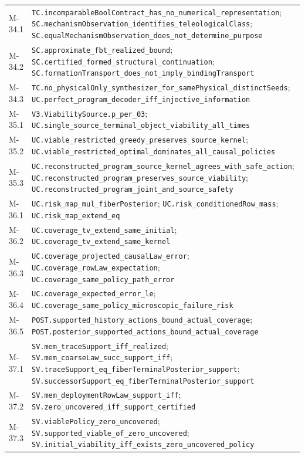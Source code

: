 \documentclass[
  english,
  11pt,
  oneside]{book}
\begin{document}
{\begin{longtable}[]{@{}
  >{\raggedright\arraybackslash}p{}
  >{\raggedright\arraybackslash}p{}@{}}
M-34.1 & \nolinkurl{TC.incomparableBoolContract_has_no_numerical_representation}; \nolinkurl{SC.mechanismObservation_identifies_teleologicalClass}; \nolinkurl{SC.equalMechanismObservation_does_not_determine_purpose} \\
M-34.2 & \nolinkurl{SC.approximate_fbt_realized_bound}; \nolinkurl{SC.certified_formed_structural_continuation}; \nolinkurl{SC.formationTransport_does_not_imply_bindingTransport} \\
M-34.3 & \nolinkurl{TC.no_physicalOnly_synthesizer_for_samePhysical_distinctSeeds}; \nolinkurl{UC.perfect_program_decoder_iff_injective_information} \\
M-35.1 & \nolinkurl{V3.ViabilitySource.p_per_03}; \nolinkurl{UC.single_source_terminal_object_viability_all_times} \\
M-35.2 & \nolinkurl{UC.viable_restricted_greedy_preserves_source_kernel}; \nolinkurl{UC.viable_restricted_optimal_dominates_all_causal_policies} \\
M-35.3 & \nolinkurl{UC.reconstructed_program_source_kernel_agrees_with_safe_action}; \nolinkurl{UC.reconstructed_program_preserves_source_viability}; \nolinkurl{UC.reconstructed_program_joint_and_source_safety} \\
M-36.1 & \nolinkurl{UC.risk_map_mul_fiberPosterior}; \nolinkurl{UC.risk_conditionedRow_mass}; \nolinkurl{UC.risk_map_extend_eq} \\
M-36.2 & \nolinkurl{UC.coverage_tv_extend_same_initial}; \nolinkurl{UC.coverage_tv_extend_same_kernel} \\
M-36.3 & \nolinkurl{UC.coverage_projected_causalLaw_error}; \nolinkurl{UC.coverage_rowLaw_expectation}; \nolinkurl{UC.coverage_same_policy_path_error} \\
M-36.4 & \nolinkurl{UC.coverage_expected_error_le}; \nolinkurl{UC.coverage_same_policy_microscopic_failure_risk} \\
M-36.5 & \nolinkurl{POST.supported_history_actions_bound_actual_coverage}; \nolinkurl{POST.posterior_supported_actions_bound_actual_coverage} \\
M-37.1 & \nolinkurl{SV.mem_traceSupport_iff_realized}; \nolinkurl{SV.mem_coarseLaw_succ_support_iff}; \nolinkurl{SV.traceSupport_eq_fiberTerminalPosterior_support}; \nolinkurl{SV.successorSupport_eq_fiberTerminalPosterior_support} \\
M-37.2 & \nolinkurl{SV.mem_deploymentRowLaw_support_iff}; \nolinkurl{SV.zero_uncovered_iff_support_certified} \\
M-37.3 & \nolinkurl{SV.viablePolicy_zero_uncovered}; \nolinkurl{SV.supported_viable_of_zero_uncovered}; \nolinkurl{SV.initial_viability_iff_exists_zero_uncovered_policy} \\

\end{longtable}}
\end{document}
